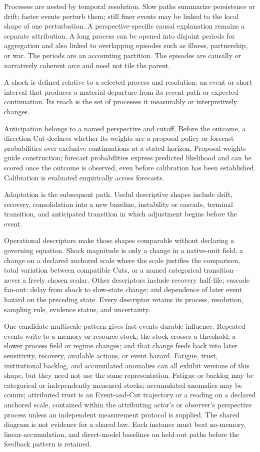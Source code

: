 \documentclass[10pt]{article}
\begin{document}
Processes are nested by temporal resolution. Slow paths summarize persistence
or drift; faster events perturb them; still finer events may be linked to the
local shape of one perturbation. A perspective-specific causal explanation remains a
separate attribution. A long process can be opened into disjoint periods
for aggregation and also linked to overlapping episodes such as illness,
partnership, or war. The periods are an accounting partition. The episodes are
causally or narratively coherent arcs and need not tile the parent.

A shock is defined relative to a selected process and resolution: an event or
short interval that produces a material departure from its recent path or
expected continuation. Its reach is the set of processes it measurably or
interpretively changes.

Anticipation belongs to a named perspective and cutoff. Before the outcome, a
direction Cut declares whether its weights are a proposal policy or forecast
probabilities over exclusive continuations at a stated horizon. Proposal
weights guide construction; forecast probabilities express predicted
likelihood and can be scored once the outcome is observed, even before
calibration has been established. Calibration is evaluated empirically across
forecasts.

Adaptation is the subsequent path. Useful descriptive shapes
include drift, recovery, consolidation into a new baseline, instability or
cascade, terminal transition, and anticipated transition in which adjustment
begins before the event.

Operational descriptors make those shapes comparable without declaring a
governing equation. Shock magnitude is only a change in a native-unit field, a change on a declared
anchored scale where the scale justifies the comparison, total variation
between compatible Cuts, or a named categorical transition---never a freely
chosen scalar. Other descriptors include recovery
half-life; cascade fan-out; delay from shock to slow-state change;
and dependence of later event hazard on the preceding state. Every descriptor
retains its process, resolution, sampling rule, evidence status, and uncertainty.

One candidate multiscale pattern gives fast events durable influence. Repeated
events write to a memory or resource stock; the stock crosses a threshold; a
slower process field or regime changes; and that change feeds back into later
sensitivity, recovery, available actions, or event hazard. Fatigue, trust,
institutional backlog, and accumulated anomalies can all exhibit versions of
this shape, but they need not use the same representation. Fatigue or backlog
may be categorical or independently measured stocks; accumulated anomalies may
be counts; attributed trust is an Event-and-Cut trajectory or a reading on a declared
anchored scale, contained within the attributing actor's or observer's
perspective process unless an independent measurement protocol is supplied. The shared diagram is not
evidence for a shared law. Each instance
must beat no-memory, linear-accumulation, and direct-model baselines on held-out
paths before the feedback pattern is retained.
\end{document}
